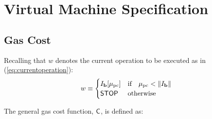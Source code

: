 
\section{Virtual Machine Specification}
\label{app:vm}

\subsection{Gas Cost}

Recalling that $w$ denotes the current operation to be executed as in (\ref{eq:currentoperation}):
\begin{equation*}
w \equiv \begin{cases} I_{\mathbf{b}}[\mathbf{\mu}_{\mathrm{pc}}] & \text{if} \quad \mathbf{\mu}_{\mathrm{pc}} < \lVert I_{\mathbf{b}} \rVert\\
\mathsf{STOP} & \text{otherwise}
\end{cases}
\end{equation*}

The general gas cost function, $\mathsf{C}$, is defined as:

